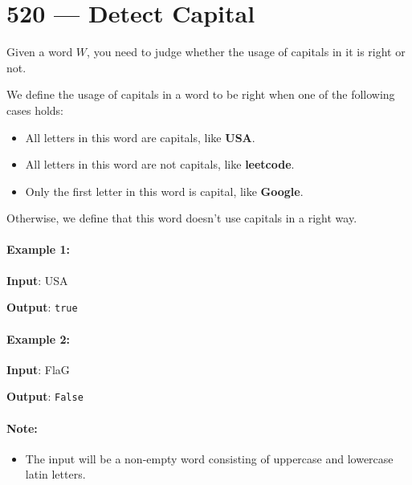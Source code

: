 \section{520 --- Detect Capital}
Given a word $W$, you need to judge whether the usage of capitals in it is right or not.

We define the usage of capitals in a word to be right when one of the following cases holds:

\begin{itemize}
\item  All letters in this word are capitals, like \textbf{USA}.
\item  All letters in this word are not capitals, like \textbf{leetcode}.
\item  Only the first letter in this word is capital, like \textbf{Google}.
\end{itemize}

Otherwise, we define that this word doesn't use capitals in a right way.

 

\paragraph{Example 1:}

\begin{flushleft}
\textbf{Input}: USA

\textbf{Output}: \texttt{true}
\end{flushleft}

 

\paragraph{Example 2:}

\begin{flushleft}
\textbf{Input}: FlaG

\textbf{Output}: \texttt{False}
\end{flushleft}

 

\paragraph{Note: }

\begin{itemize}
\item The input will be a non-empty word consisting of uppercase and lowercase latin letters.
\end{itemize}
